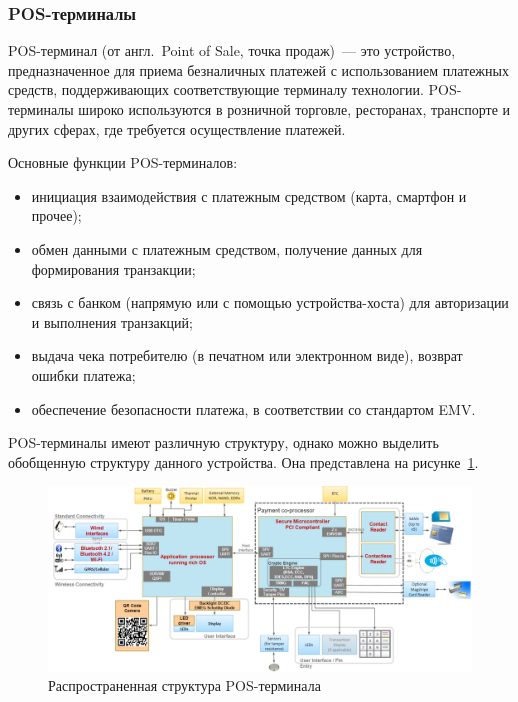\subsubsection{POS-терминалы}

POS-терминал (от англ.\ Point of Sale, точка продаж)~--- это устройство, предназначенное для приема безналичных платежей с использованием платежных средств, поддерживающих соответствующие терминалу технологии.
POS-терминалы широко используются в розничной торговле, ресторанах, транспорте и других сферах, где требуется осуществление платежей.

Основные функции POS-терминалов:

\begin{itemize}
    \item инициация взаимодействия с платежным средством (карта, смартфон и прочее);
    \item обмен данными с платежным средством, получение данных для формирования транзакции;
    \item связь с банком (напрямую или с помощью устройства-хоста) для авторизации и выполнения транзакций;
    \item выдача чека потребителю (в печатном или электронном виде), возврат ошибки платежа;
    \item обеспечение безопасности платежа, в соответствии со стандартом EMV.
\end{itemize}

POS-терминалы имеют различную структуру, однако можно выделить обобщенную структуру данного устройства.
Она представлена на рисунке~\ref{fig:postrem_struct}.

\begin{figure}[H]
    \centering
    \includegraphics[width=1\textwidth]{images/research/postrem_struct}
    \caption{\centering Распространенная структура POS-терминала}
    \label{fig:postrem_struct}
\end{figure}

